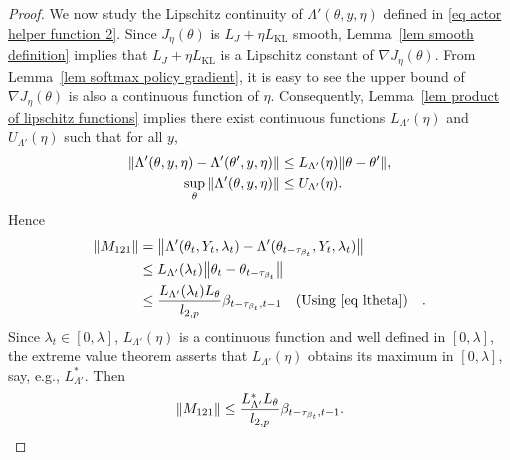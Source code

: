 \documentclass[twoside,11pt]{article}
\numberwithin{assucounter}{section}
\begin{document}
\begin{proof}
  We now study the Lipschitz continuity of $\Lambda'(\theta, y, \eta)$ defined in \eqref{eq actor helper function 2}.
  Since $J_\eta(\theta)$ is $L_J + \eta L_\text{KL}$ smooth,
  Lemma~\ref{lem smooth definition} implies that
  $L_J + \eta L_\text{KL}$ is a Lipschitz constant of $\nabla J_\eta(\theta)$.
  From Lemma~\ref{lem softmax policy gradient},
  it is easy to see the upper bound of $\nabla J_\eta(\theta)$ is also a continuous function of $\eta$.
  Consequently,
  Lemma~\ref{lem product of lipschitz functions} implies
  there exist continuous functions $L_{\Lambda'}(\eta)$ and $U_{\Lambda'}(\eta)$ such that
  for all $y$,
  \begin{align}
    \label{eq lambda prime constants}
    \norm{\Lambda'(\theta, y, \eta) - \Lambda'(\theta', y, \eta)} &\leq L_{\Lambda'}(\eta) \norm{\theta -\theta'}, \\
    \sup_\theta \norm{\Lambda'(\theta, y, \eta)} &\leq U_{\Lambda'}(\eta).
  \end{align}
  Hence
  \begin{align}
    \norm{M_{121}} &= \norm{\Lambda'(\theta_t, Y_t, \lambda_t) - \Lambda'(\theta_{t-\tau_{\beta_t}}, Y_t, \lambda_t)} \\
    &\leq L_{\Lambda'}(\lambda_t) \norm{\theta_t - \theta_{t-\tau_{\beta_t}}} \\
    &\leq \frac{L_{\Lambda'}(\lambda_t) L_\theta}{l_{2, p}} \beta_{t-\tau_{\beta_t}, t-1} \qq{(Using \eqref{eq ltheta})}.
  \end{align}
  Since $\lambda_t \in [0, \lambda]$, 
  $L_{\Lambda'}(\eta)$ is a continuous function and well defined in $[0, \lambda]$,
  the extreme value theorem asserts that $L_{\Lambda'}(\eta)$ obtains its maximum in $[0, \lambda]$,
  say, e.g., $L_{\Lambda'}^*$.
  Then 
  \begin{align}
    \norm{M_{121}} \leq \frac{L_{\Lambda'}^* L_\theta}{l_{2, p}} \beta_{t-\tau_{\beta_t}, t-1}.
  \end{align}
\end{proof}
\end{document}
